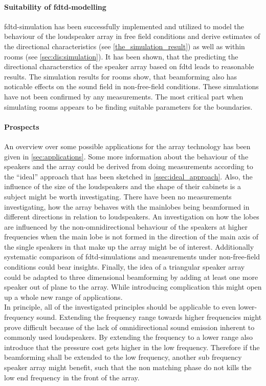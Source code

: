\paragraph{Suitability of \gls{fdtd}-modelling}
\gls{fdtd}-simulation has been successfully implemented and utilized to model the behaviour of the loudspeaker array in free field conditions and derive estimates of the directional characteristics (see \autoref{the_simulation_result}) as well as within rooms (see \autoref{sec:dis:simulation}). It has been shown, that the predicting the directional characterstics of the speaker array based on \gls{fdtd} leads to reasonable results. The simulation results for rooms show, that beamforming also has noticable effects on the sound field in non-free-field conditions. These simulations have not been confirmed by any measurements. The most critical part when simulating rooms appears to be finding suitable parameters for the boundaries.
\paragraph{Prospects}
An overview over some possible applications for the array technology has been given in \autoref{sec:applications}. Some more information about the behaviour of the speakers and the array could be derived from doing measurements according to the ``ideal'' approach that has been sketched in \autoref{ssec:ideal_approach}. Also, the influence of the size of the loudspeakers and the shape of their cabinets is a subject might be worth investigating. There have been no measurements investigating, how the array behaves with the mainlobes being beamformed in different directions in relation to loudspeakers. An investigation on how the lobes are influenced by the non-omnidirectional behaviour of the speakers at higher frequencies when the main lobe is not formed in the direction of the main axis of the single speakers in that make up the array might be of interest. Additionally systematic comparison of \gls{fdtd}-simulations and measurements under non-free-field conditions could bear insights.
Finally, the idea of a triangular speaker array could be adapted to three dimensional beamforming by adding at least one more speaker out of plane to the array. While introducing complication this might open up a whole new range of applications.\\
In principle, all of the investigated principles should be applicable to even lower-frequency sound. Extending the frequency range towards higher frequencies might prove difficult because of the lack of omnidirectional sound emission inherent to commonly used loudspeakers. By extending the frequency to a lower range also introduce that the pressure cost gets higher in the low frequency. Therefore if the beamforming shall be extended to the low frequency, another sub frequency speaker array might benefit, such that the non matching phase do not kills the low end frequency in the front of the array.
